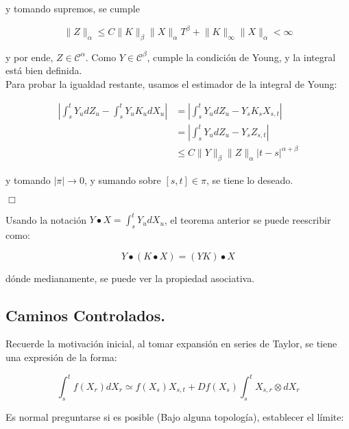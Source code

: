y tomando supremos, se cumple

\[
	\lVert Z \rVert_{\alpha} \leq C \lVert K \rVert_{\beta} \lVert X \rVert_{\alpha} T^{\beta} + \lVert K \rVert_{\infty} \lVert X \rVert_{\alpha} < \infty
\]

y por ende, $Z \in \mathcal{C}^{\alpha}$. Como $Y \in \mathcal{C}^{\beta}$, cumple la condición de Young, y la integral está bien definida. \\

Para probar la igualdad restante, usamos el estimador de la integral de Young:

\begin{align*}
	\left\lvert \int_s^t Y_u dZ_u - \int_s^t Y_u K_u dX_u \right\rvert &= \left\lvert \int_s^t Y_u dZ_u - Y_s K_s X_{s,t} \right\rvert \\
	&=  \left \lvert \int_s^t Y_u dZ_u - Y_s Z_{s,t} \right \rvert\\
	&\leq C \lVert Y \rVert_{\beta} \lVert Z \rVert_{\alpha} \lvert t - s \rvert^{\alpha + \beta}
\end{align*}

y tomando $\lvert \pi \rvert \rightarrow 0$, y sumando sobre $[s,t] \in \pi$, se tiene lo deseado. 

\begin{flushright}
	$\Box$
\end{flushright}

Usando la notación $Y \bullet X = \int_s^t Y_u dX_u$, el teorema anterior se puede reescribir como:

\[
	Y \bullet (K \bullet X) = (Y K) \bullet X
\] 

dónde medianamente, se puede ver la propiedad asociativa.








\subsection{Caminos Controlados.}


Recuerde la motivación inicial, al tomar expansión en series de Taylor, se tiene una expresión de la forma:

\[
	\int_s^t f(X_r) dX_r \simeq f(X_s) X_{s,t} + D f(X_s) \int_s^t X_{s,r} \otimes dX_r
\] 

Es normal preguntarse si es posible (Bajo alguna topología), establecer el límite:

